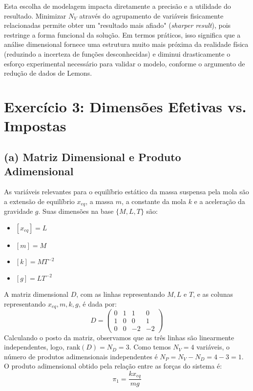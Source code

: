 \documentclass{article}
\begin{document}
Esta escolha de modelagem impacta diretamente a precisão e a utilidade do resultado. Minimizar $N_V$ através do agrupamento de variáveis fisicamente relacionadas permite obter um "resultado mais afiado" (\textit{sharper result}), pois restringe a forma funcional da solução. Em termos práticos, isso significa que a análise dimensional fornece uma estrutura muito mais próxima da realidade física (reduzindo a incerteza de funções desconhecidas) e diminui drasticamente o esforço experimental necessário para validar o modelo, conforme o argumento de redução de dados de Lemons.

\section*{Exercício 3: Dimensões Efetivas vs. Impostas}

\subsection*{(a) Matriz Dimensional e Produto Adimensional}
As variáveis relevantes para o equilíbrio estático da massa suspensa pela mola são a extensão de equilíbrio $x_{eq}$, a massa $m$, a constante da mola $k$ e a aceleração da gravidade $g$. Suas dimensões na base $\{M, L, T\}$ são:
\begin{itemize}
    \item $[x_{eq}] = L$
    \item $[m] = M$
    \item $[k] = MT^{-2}$
    \item $[g] = LT^{-2}$
\end{itemize}

A matriz dimensional $D$, com as linhas representando $M, L$ e $T$, e as colunas representando $x_{eq}, m, k, g$, é dada por:
\[
D = \left( \begin{array}{cccc}
0 & 1 & 1 & 0 \\
1 & 0 & 0 & 1 \\
0 & 0 & -2 & -2
\end{array} \right)
\]
Calculando o posto da matriz, observamos que as três linhas são linearmente independentes, logo, $\text{rank}(D) = N_D = 3$. Como temos $N_V = 4$ variáveis, o número de produtos adimensionais independentes é $N_P = N_V - N_D = 4 - 3 = 1$. 
O produto adimensional obtido pela relação entre as forças do sistema é:
\[ \pi_1 = \frac{k x_{eq}}{m g} \]
\end{document}
